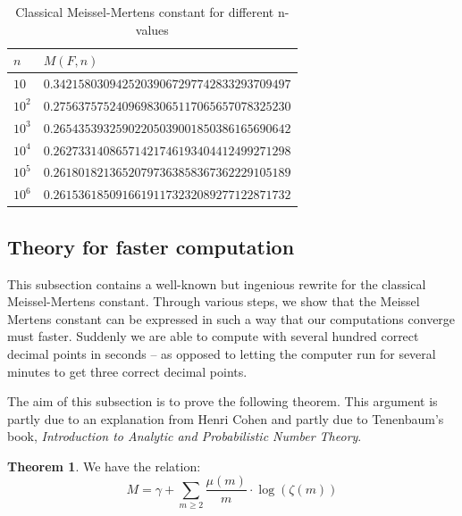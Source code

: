 \documentclass{article}
\theoremstyle{definition}
\newtheorem{theorem}{Theorem}[section]
\theoremstyle{remark}
\begin{document}
\begin{table}[H]
\centering
\label{ClassicalMTable}
\begin{tabular}{|l|l|}
\hline
$n$                    & $M(F,n)$                                                             \\ \hline
$10$                   & $0.34215803094252039067297742833293709497 $
			\\ \hline
$10^2$ & $0.27563757524096983065117065657078325230$                     \\ \hline
$10^3$ & $0.26543539325902205039001850386165690642$                      \\ \hline
$10^4$ & $0.26273314086571421746193404412499271298$                      \\ \hline
$10^5$ & $0.26180182136520797363858367362229105189$                      \\ \hline
$10^6$ & $0.26153618509166191173232089277122871732$                      \\ \hline
\end{tabular}
\caption{Classical Meissel-Mertens constant for different n-values }
\end{table}

\subsection{Theory for faster computation}
This subsection contains a well-known but ingenious rewrite for the classical Meissel-Mertens constant. Through various steps, we show that the Meissel Mertens constant can be expressed in such a way that our computations converge must faster. Suddenly we are able to compute with several hundred correct decimal points in seconds -- as opposed to letting the computer run for several minutes to get three correct decimal points.


The aim of this subsection is to prove the following theorem. This argument is partly due to an explanation from Henri Cohen and partly due to Tenenbaum's book, \textit{Introduction to Analytic and Probabilistic Number Theory}.
\begin{theorem} \label{fasterMTheorem}
We have the relation:
$$M=\gamma+\sum_{m\geq 2} \frac{\mu(m)}{m}\cdot \log(\zeta(m))$$
\end{theorem}
\end{document}
